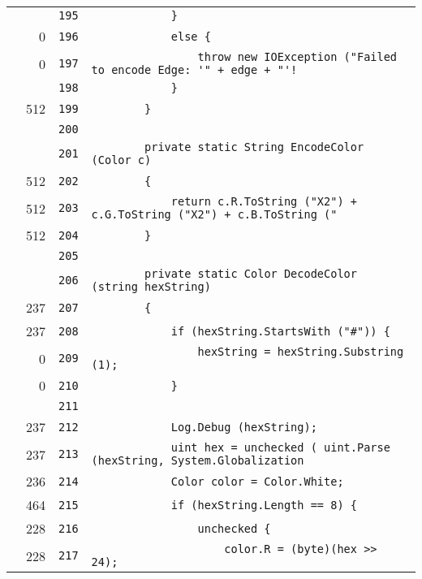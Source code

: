 \documentclass[a4paper,10pt]{article}
\begin{document}
\begin{longtable}[l]{lrrl}
\cellcolor{gray} &  & \verb~195~ & \verb~            }~\\
\cellcolor{red} & 0 & \verb~196~ & \verb~            else {~\\
\cellcolor{red} & 0 & \verb~197~ & \verb~                throw new IOException ("Failed to encode Edge: '" + edge + "'!~\\
\cellcolor{gray} &  & \verb~198~ & \verb~            }~\\
\cellcolor{green} & 512 & \verb~199~ & \verb~        }~\\
\cellcolor{gray} &  & \verb~200~ & \verb~~\\
\cellcolor{gray} &  & \verb~201~ & \verb~        private static String EncodeColor (Color c)~\\
\cellcolor{green} & 512 & \verb~202~ & \verb~        {~\\
\cellcolor{green} & 512 & \verb~203~ & \verb~            return c.R.ToString ("X2") + c.G.ToString ("X2") + c.B.ToString ("~\\
\cellcolor{green} & 512 & \verb~204~ & \verb~        }~\\
\cellcolor{gray} &  & \verb~205~ & \verb~~\\
\cellcolor{gray} &  & \verb~206~ & \verb~        private static Color DecodeColor (string hexString)~\\
\cellcolor{green} & 237 & \verb~207~ & \verb~        {~\\
\cellcolor{green} & 237 & \verb~208~ & \verb~            if (hexString.StartsWith ("#")) {~\\
\cellcolor{red} & 0 & \verb~209~ & \verb~                hexString = hexString.Substring (1);~\\
\cellcolor{red} & 0 & \verb~210~ & \verb~            }~\\
\cellcolor{gray} &  & \verb~211~ & \verb~~\\
\cellcolor{green} & 237 & \verb~212~ & \verb~            Log.Debug (hexString);~\\
\cellcolor{green} & 237 & \verb~213~ & \verb~            uint hex = unchecked ( uint.Parse (hexString, System.Globalization~\\
\cellcolor{green} & 236 & \verb~214~ & \verb~            Color color = Color.White;~\\
\cellcolor{green} & 464 & \verb~215~ & \verb~            if (hexString.Length == 8) {~\\
\cellcolor{green} & 228 & \verb~216~ & \verb~                unchecked {~\\
\cellcolor{green} & 228 & \verb~217~ & \verb~                    color.R = (byte)(hex >> 24);~\\

\end{longtable}
\end{document}
